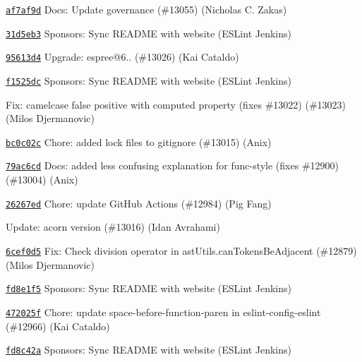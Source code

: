 \begin{DoxyItemize}
\item \href{https://github.com/eslint/eslint/commit/af7af9d32ea8073d2d0d726cc8551351261a170f}{\texttt{ {\ttfamily af7af9d}}} Docs\+: Update governance (\#13055) (Nicholas C. Zakas)
\item \href{https://github.com/eslint/eslint/commit/31d5eb3e60b6c2ee26976721f07cc89d60867659}{\texttt{ {\ttfamily 31d5eb3}}} Sponsors\+: Sync README with website (ESLint Jenkins)
\item \href{https://github.com/eslint/eslint/commit/95613d46b7900b3d9757a7f6959d5dfb262f29fc}{\texttt{ {\ttfamily 95613d4}}} Upgrade\+: espree@6.. (\#13026) (Kai Cataldo)
\item \href{https://github.com/eslint/eslint/commit/f1525dc45dfdbbe31e724671270785b41cffc6bd}{\texttt{ {\ttfamily f1525dc}}} Sponsors\+: Sync README with website (ESLint Jenkins)
\item \href{https://github.com/eslint/eslint/commit/0243549db4d237cb78e720d55a9cae89b91f6830}{\texttt{ {}}} Fix\+: camelcase false positive with computed property (fixes \#13022) (\#13023) (Milos Djermanovic)
\item \href{https://github.com/eslint/eslint/commit/bc0c02cd0368559c7a7b1510eb4620022a4cc31c}{\texttt{ {\ttfamily bc0c02c}}} Chore\+: added lock files to gitignore (\#13015) (Anix)
\item \href{https://github.com/eslint/eslint/commit/79ac6cd2d8e4c32e03dfea10a957806845058573}{\texttt{ {\ttfamily 79ac6cd}}} Docs\+: added less confusing explanation for func-\/style (fixes \#12900) (\#13004) (Anix)
\item \href{https://github.com/eslint/eslint/commit/26267ed70270ef746b785c09e267f815bf7c596a}{\texttt{ {\ttfamily 26267ed}}} Chore\+: update Git\+Hub Actions (\#12984) (Pig Fang)
\item \href{https://github.com/eslint/eslint/commit/12997058626b5167ba4b9d2ae0d0ea965a01c4be}{\texttt{ {}}} Update\+: acorn version (\#13016) (Idan Avrahami)
\item \href{https://github.com/eslint/eslint/commit/6cef0d50a0d131bc8897799a54e1af1d38606db4}{\texttt{ {\ttfamily 6cef0d5}}} Fix\+: Check division operator in ast\+Utils.\+can\+Tokens\+Be\+Adjacent (\#12879) (Milos Djermanovic)
\item \href{https://github.com/eslint/eslint/commit/fd8e1f52110cada542a120750236fd1ec8779336}{\texttt{ {\ttfamily fd8e1f5}}} Sponsors\+: Sync README with website (ESLint Jenkins)
\item \href{https://github.com/eslint/eslint/commit/472025f2814d0360fe8d4cddbcba049982e1cd43}{\texttt{ {\ttfamily 472025f}}} Chore\+: update space-\/before-\/function-\/paren in eslint-\/config-\/eslint (\#12966) (Kai Cataldo)
\item \href{https://github.com/eslint/eslint/commit/fd8c42ada52f0ae2488ad96ee8fee675f63134ce}{\texttt{ {\ttfamily fd8c42a}}} Sponsors\+: Sync README with website (ESLint Jenkins)
\end{DoxyItemize}


